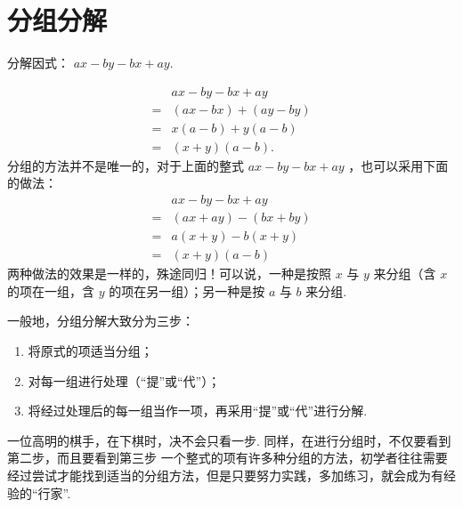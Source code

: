 \section{分组分解}
\begin{example}[分组分解三部曲]
	分解因式： $a x-b y-b x+a y .$
\end{example}
\begin{solution}
	\begin{align*}
		  & a x-b y-b x+a y     \\
		= & (a x-b x)+(a y-b y) \\
		= & x(a-b)+y(a-b)       \\
		= & (x+y)(a-b) .
	\end{align*}
	分组的方法并不是唯一的，对于上面的整式 $a x-b y-b x+a y$ ，也可以采用下面的做法：
	\begin{align*}
		  & a x-b y-b x+a y     \\
		= & (a x+a y)-(b x+b y) \\
		= & a(x+y)-b(x+y)       \\
		= & (x+y)(a-b)
	\end{align*}
	两种做法的效果是一样的，殊途同归！可以说，一种是按照 $x$ 与 $y$ 来分组（含 $x$ 的项在一组，含 $y$ 的项在另一组）；另一种是按 $a$ 与 $b$ 来分组.
\end{solution}
一般地，分组分解大致分为三步：
\begin{enumerate}
	\item 将原式的项适当分组；
	\item 对每一组进行处理（“提”或“代”）；
	\item 将经过处理后的每一组当作一项，再采用“提”或“代”进行分解.
\end{enumerate}
一位高明的棋手，在下棋时，决不会只看一步. 同样，在进行分组时，不仅要看到第二步，而且要看到第三步
一个整式的项有许多种分组的方法，初学者往往需要经过尝试才能找到适当的分组方法，但是只要努力实践，多加练习，就会成为有经验的“行家”.

